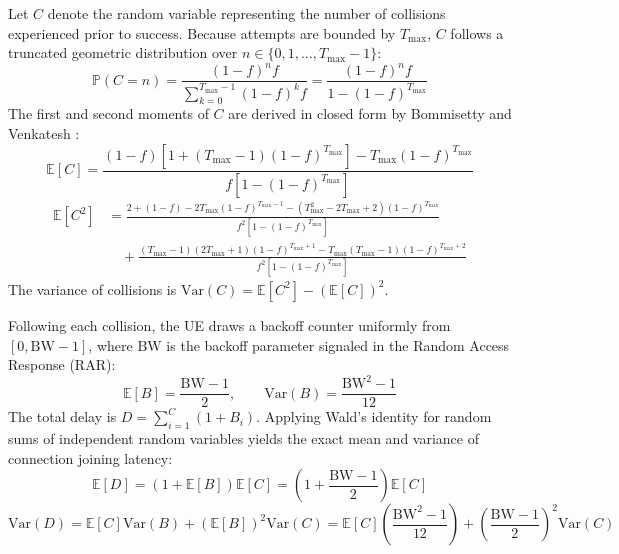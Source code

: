 Let $C$ denote the random variable representing the number of collisions experienced prior to success. Because attempts are bounded by $T_{\max}$, $C$ follows a truncated geometric distribution over $n \in \{0, 1, \dots, T_{\max}-1\}$:
\begin{equation}
    \mathbb{P}(C = n) = \frac{(1 - f)^n f}{\sum_{k=0}^{T_{\max}-1} (1 - f)^k f} = \frac{(1 - f)^n f}{1 - (1 - f)^{T_{\max}}}
\end{equation}
The first and second moments of $C$ are derived in closed form by Bommisetty and Venkatesh \cite{bommisetty2023connection}:
\begin{equation}
    \label{eq:EC_moment}
    \mathbb{E}[C] = \frac{(1 - f) \left[ 1 + (T_{\max} - 1)(1 - f)^{T_{\max}} \right] - T_{\max}(1 - f)^{T_{\max}}}{f \left[ 1 - (1 - f)^{T_{\max}} \right]}
\end{equation}
\begin{align}
    \label{eq:EC2_moment}
    \mathbb{E}[C^2] &= \frac{2 + (1 - f) - 2 T_{\max}(1 - f)^{T_{\max}-1} - (T_{\max}^2 - 2 T_{\max} + 2)(1 - f)^{T_{\max}}}{f^2 \left[ 1 - (1 - f)^{T_{\max}} \right]} \nonumber \\
    &\quad + \frac{(T_{\max} - 1)(2 T_{\max} + 1)(1 - f)^{T_{\max}+1} - T_{\max}(T_{\max}-1)(1 - f)^{T_{\max}+2}}{f^2 \left[ 1 - (1 - f)^{T_{\max}} \right]}
\end{align}
The variance of collisions is $\mathrm{Var}(C) = \mathbb{E}[C^2] - (\mathbb{E}[C])^2$.

Following each collision, the UE draws a backoff counter uniformly from $[0, \mathrm{BW} - 1]$, where $\mathrm{BW}$ is the backoff parameter signaled in the Random Access Response (RAR):
\begin{equation}
    \mathbb{E}[B] = \frac{\mathrm{BW} - 1}{2}, \qquad \mathrm{Var}(B) = \frac{\mathrm{BW}^2 - 1}{12}
\end{equation}
The total delay is $D = \sum_{i=1}^C (1 + B_i)$. Applying Wald's identity for random sums of independent random variables yields the exact mean and variance of connection joining latency:
\begin{equation}
    \label{eq:ED_mean}
    \mathbb{E}[D] = (1 + \mathbb{E}[B]) \mathbb{E}[C] = \left( 1 + \frac{\mathrm{BW}-1}{2} \right) \mathbb{E}[C]
\end{equation}
\begin{equation}
    \label{eq:VarD_variance}
    \mathrm{Var}(D) = \mathbb{E}[C] \mathrm{Var}(B) + (\mathbb{E}[B])^2 \mathrm{Var}(C) = \mathbb{E}[C] \left( \frac{\mathrm{BW}^2 - 1}{12} \right) + \left( \frac{\mathrm{BW}-1}{2} \right)^2 \mathrm{Var}(C)
\end{equation}

